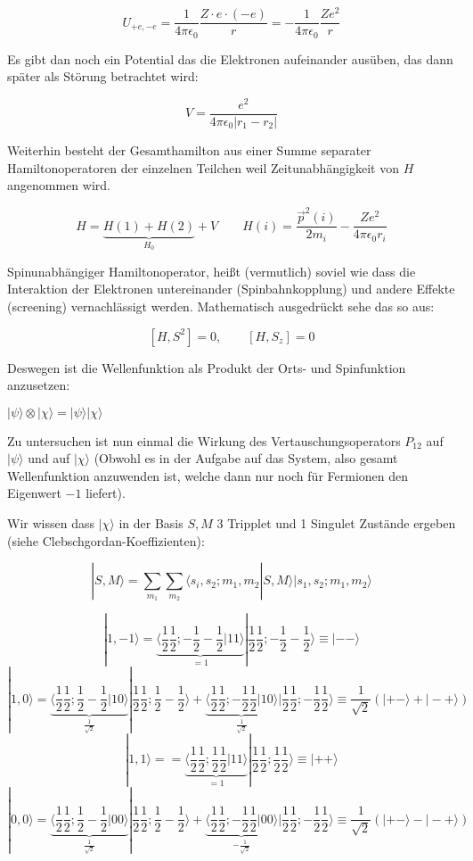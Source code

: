 \[ U_{+e,-e} =\frac{1}{4\pi\epsilon_0}\frac{Z\cdot e \cdot (-e)}{r} = - \frac{1}{4\pi\epsilon_0}\frac{Ze^2}{r}\]

Es gibt dan noch ein Potential das die Elektronen aufeinander ausüben, das dann später als Störung betrachtet wird:

\[V = \frac{ e^2}{4\pi\epsilon_0 |r_1-r_2|} \]



Weiterhin besteht der Gesamthamilton aus einer Summe separater Hamiltonoperatoren der einzelnen Teilchen weil Zeitunabhängigkeit von \(H\) angenommen wird. 

\[H = \underbrace{H(1)+H(2)}_{H_0} + V\qquad H(i)= \frac{\vec p^2(i)}{2m_i} - \frac{Z e^2}{4\pi\epsilon_0r_i} \]


Spinunabhängiger Hamiltonoperator, heißt (vermutlich) soviel wie dass die Interaktion der Elektronen untereinander (Spinbahnkopplung) und andere Effekte (screening) vernachlässigt werden. Mathematisch ausgedrückt sehe das so aus:

\[[H,S^2]=0,\qquad [H,S_z]=0\]

Deswegen ist die Wellenfunktion als Produkt der Orts- und Spinfunktion anzusetzen:

\(|\psi\rangle \otimes |\chi\rangle  = |\psi\rangle|\chi\rangle  \)

Zu untersuchen ist nun einmal die Wirkung des Vertauschungsoperators \(P_{12}\) auf \(|\psi\rangle \) und auf \(|\chi \rangle \) (Obwohl es in der Aufgabe auf das System, also gesamt Wellenfunktion anzuwenden ist, welche dann nur noch für Fermionen den Eigenwert \(-1\) liefert).

Wir wissen dass \(|\chi\rangle \) in der Basis \(S,M\) 3 Tripplet und 1 Singulet Zustände ergeben (siehe Clebschgordan-Koeffizienten):

\[|S,M\rangle = \sum_{m_1}\sum_{m_2}\langle s_i,s_2;m_1,m_2|S,M\rangle |s_1,s_2;m_1,m_2\rangle \]

\[|1,-1\rangle =\underbrace{ \langle \frac{1}{2}\frac{1}{2};-\frac{1}{2}-\frac{1}{2}|11\rangle }_{=1}  | \frac{1}{2}\frac{1}{2};  -\frac{1}{2} -\frac{1}{2} \rangle   \equiv |--\rangle   \]
\[|1,0\rangle =  \underbrace{\langle \frac{1}{2}   \frac{1}{2}; \frac{1}{2} - \frac{1}{2}|10\rangle  }_{\frac{1}{\sqrt{2}}}|\frac{1}{2}   \frac{1}{2}; \frac{1}{2} - \frac{1}{2}\rangle  +  \underbrace{\langle \frac{1}{2}   \frac{1}{2}; -\frac{1}{2} \frac{1}{2}|10\rangle  }_{\frac{1}{\sqrt{2}}} |\frac{1}{2}   \frac{1}{2}; -\frac{1}{2} \frac{1}{2} \rangle \equiv  \frac{1}{\sqrt{2}} (|+-\rangle +  |-+\rangle )   \]
\[|1,1\rangle = =\underbrace{ \langle \frac{1}{2}\frac{1}{2};\frac{1}{2}\frac{1}{2}|11\rangle }_{=1}  | \frac{1}{2}\frac{1}{2};  \frac{1}{2} \frac{1}{2} \rangle   \equiv |++\rangle   \]
\[|0,0\rangle = \underbrace{\langle \frac{1}{2}   \frac{1}{2}; \frac{1}{2} - \frac{1}{2}|00\rangle  }_{\frac{1}{\sqrt{2}}}|\frac{1}{2}   \frac{1}{2}; \frac{1}{2} - \frac{1}{2}\rangle  +  \underbrace{\langle \frac{1}{2}   \frac{1}{2}; -\frac{1}{2} \frac{1}{2}|00\rangle  }_{-\frac{1}{\sqrt{2}}} |\frac{1}{2}   \frac{1}{2}; -\frac{1}{2} \frac{1}{2} \rangle \equiv  \frac{1}{\sqrt{2}} (|+-\rangle -  |-+\rangle ) \]

